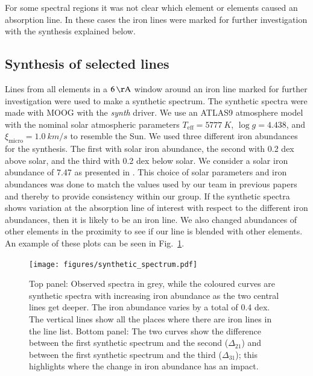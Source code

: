 \documentclass{aa}
\begin{document}
For some spectral regions it was not clear which element or elements
caused an absorption line. In these cases the iron lines were marked for
further investigation with the synthesis explained below.


\subsection{Synthesis of selected lines}
\label{sub:synthesis_of_selected_lines}

Lines from all elements in a $\SI{6}{\AA}$ window around an iron line
marked for further investigation were used to make a synthetic spectrum.
The synthetic spectra were made with MOOG with the \emph{synth} driver.
We use an ATLAS9 atmosphere model \citep{Kurucz1993} with the nominal
solar atmospheric parameters $T_\mathrm{eff}=\SI{5777}{K}$, $\log
g = 4.438$, and $\xi_\mathrm{micro} = \SI{1.0}{km/s}$ to resemble
the Sun. We used three different iron abundances for the synthesis.
The first with solar iron abundance, the second with 0.2 dex above
solar, and the third with 0.2 dex below solar. We consider a solar iron
abundance of 7.47 as presented in \cite{Gonzalez2000}. This choice
of solar parameters and iron abundances was done to match the values
used by our team in previous papers \citep[see e.g.][and references
therein]{Santos13} and thereby to provide consistency within our group.
If the synthetic spectra shows variation at the absorption line of
interest with respect to the different iron abundances, then it is
likely to be an iron line. We also changed abundances of other elements
in the proximity to see if our line is blended with other elements. An
example of these plots can be seen in Fig.~\ref{fig:synthesis}.

\begin{figure}[tpb]
    \centering
    \texttt{[image: figures/synthetic\_spectrum.pdf]}
    \caption{Top panel: Observed spectra in grey, while the
    coloured curves are synthetic spectra with increasing iron abundance
    as the two central lines get deeper. The iron abundance varies by a total
    of 0.4 dex. The vertical lines show all the places where there are
    iron lines in the line list. Bottom panel: The two curves show
    the difference between the first synthetic spectrum and the second
    ($\Delta_{21}$) and between the first synthetic
    spectrum and the third ($\Delta_{31}$); this highlights
    where the change in iron abundance has an impact.}
    \label{fig:synthesis}
\end{figure}
\end{document}
